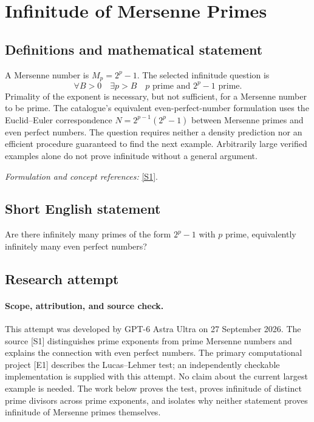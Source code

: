 \documentclass[11pt]{article}
\begin{document}
\section*{\texorpdfstring{Infinitude of Mersenne Primes}{Infinitude of Mersenne Primes}}\label{261}
\subsection{Definitions and mathematical statement}
A Mersenne number is $M_p=2^p-1$. The selected infinitude question is
\[
 \forall B>0\quad\exists p>B\quad
 p\text{ prime and }2^p-1\text{ prime}.
\]
Primality of the exponent is necessary, but not sufficient, for a Mersenne number to be prime. The catalogue's equivalent even-perfect-number formulation uses the Euclid--Euler correspondence
$N=2^{p-1}(2^p-1)$ between Mersenne primes and even perfect numbers. The question requires neither a density prediction nor an efficient procedure guaranteed to find the next example. Arbitrarily large verified examples alone do not prove infinitude without a general argument.
\par\smallskip\textit{Formulation and concept references:} \href{https://t5k.org/mersenne/index.html}{[S1]}.

\subsection{Short English statement}
Are there infinitely many primes of the form $2^p-1$ with $p$ prime, equivalently infinitely many even perfect numbers?
\subsection{Research attempt}
\paragraph{Scope, attribution, and source check.}
This attempt was developed by GPT-6 Astra Ultra on 27 September 2026.
The source [S1] distinguishes prime exponents from prime Mersenne
numbers and explains the connection with even perfect numbers.
The primary computational project [E1] describes the Lucas--Lehmer
test; an independently checkable implementation is supplied with this
attempt. No claim about the current largest example is needed.
The work below proves the test, proves infinitude of distinct prime
divisors across prime exponents, and isolates why neither statement
proves infinitude of Mersenne primes themselves.
\end{document}
